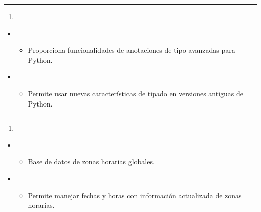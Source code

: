 \documentclass[a4paper,10pt,spanish]{sphinxmanual}
\begin{document}
\bigskip\hrule\bigskip

\begin{enumerate}
%
\setcounter{enumi}{38}
\item {} 
\sphinxAtStartPar
{}

\end{enumerate}
\begin{itemize}
\item {} 
\sphinxAtStartPar
{}
\begin{itemize}
\item {} 
\sphinxAtStartPar
Proporciona funcionalidades de anotaciones de tipo avanzadas para Python.

\end{itemize}

\item {} 
\sphinxAtStartPar
{}
\begin{itemize}
\item {} 
\sphinxAtStartPar
Permite usar nuevas características de tipado en versiones antiguas de Python.

\end{itemize}

\end{itemize}


\bigskip\hrule\bigskip

\begin{enumerate}
%
\setcounter{enumi}{39}
\item {} 
\sphinxAtStartPar
{}

\end{enumerate}
\begin{itemize}
\item {} 
\sphinxAtStartPar
{}
\begin{itemize}
\item {} 
\sphinxAtStartPar
Base de datos de zonas horarias globales.

\end{itemize}

\item {} 
\sphinxAtStartPar
{}
\begin{itemize}
\item {} 
\sphinxAtStartPar
Permite manejar fechas y horas con información actualizada de zonas horarias.

\end{itemize}

\end{itemize}
\end{document}
